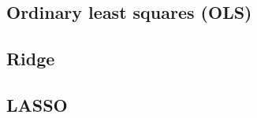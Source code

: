 \thispagestyle{plain}
\subsection{Ordinary least squares (OLS)}
\subsection{Ridge}
\subsection{LASSO}
